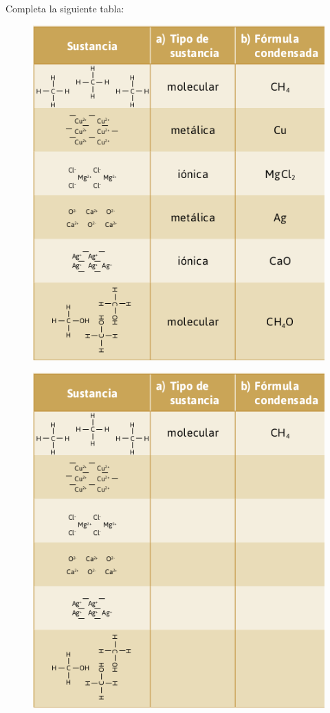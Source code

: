 Completa la siguiente tabla:

\ifprintanswers
    \begin{figure}[H]
        \centering
        \includegraphics[width=0.6\linewidth]{../images/sustancia}
    \end{figure}
\else
    \begin{figure}[H]
        \centering
        \includegraphics[width=0.6\linewidth]{../images/sustancia_sol}
    \end{figure}
\fi

